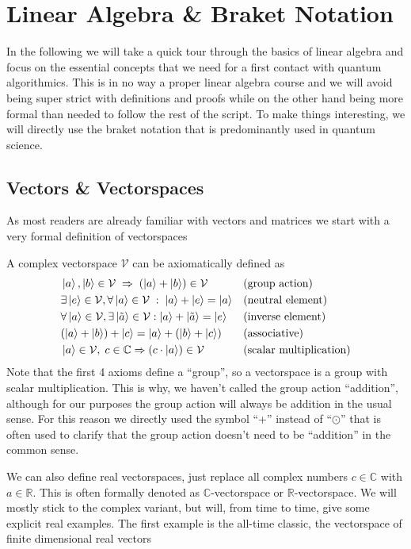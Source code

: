 \section{Linear Algebra \& Braket Notation}
In the following we will take a quick tour through the basics of linear algebra and focus on the essential concepts that we need for a first contact with quantum algorithmics. 
This is in no way a proper linear algebra course and we will avoid being super strict with definitions and proofs while on the other hand being more formal than needed to follow the rest of the script.
To make things interesting, we will directly use the braket notation that is predominantly used in quantum science.

\subsection{Vectors \& Vectorspaces}

As most readers are already familiar with vectors and matrices we start with a very formal definition of vectorspaces

\begin{def*}[Vectorspace]
A complex vectorspace $\mathcal{V}$ can be axiomatically defined as
\begin{align*}
    &\ket{a},\ket{b}\in \mathcal{V}\;\Rightarrow \; \left(\ket{a}+\ket{b}\right) \in \mathcal{V} & & (\text{group action})\\
    &\exists \ket{e}\in\mathcal{V}, \forall \ket{a}\in\mathcal{V} \;:\; \ket{a} + \ket{e} = \ket{a} & & (\text{neutral element})\\ 
    &\forall \ket{a} \in \mathcal{V}, \exists \ket{\tilde{a}} \in \mathcal{V}
: \ket{a} + \ket{\tilde{a}} = \ket{e} & & (\text{inverse element})\\     &(\ket{a} + \ket{b}) + \ket{c} = \ket{a} + (\ket{b} + \ket{c}) & & (\text{associative}) \\
    &\ket{a}\in \mathcal{V},\; c\in \mathbb{C} \Rightarrow  \left(c\cdot \ket{a} \right)\in \mathcal{V} & & (\text{scalar multiplication})
\end{align*}
Note that the first 4 axioms define a ``group'', so a vectorspace is a group with scalar multiplication. This is why, we haven't called the group action ``addition'', although for our purposes the group action will always be addition in the usual sense. For this reason we directly used the symbol ``+'' instead of ``$\odot$'' that is often used to clarify that the group action doesn't need to be ``addition'' in the common sense.
\end{def*}
We can also define real vectorspaces, just replace all complex numbers $c\in \mathbb{C}$ with $a\in \mathbb{R}$. This is often formally denoted as $\mathbb{C}$-vectorspace or $\mathbb{R}$-vectorspace. We will mostly stick to the complex variant, but will, from time to time, give some explicit real examples. The first example is the all-time classic, the vectorspace of finite dimensional real vectors

